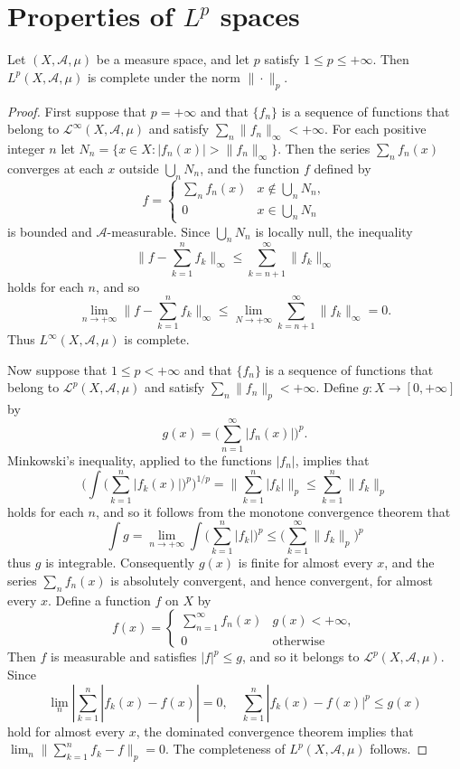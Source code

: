 \section{Properties of \boldmath$L^p$ spaces}
\begin{theorem}\label{L^p is complete}
Let $(X,\mathcal{A},\mu)$ be a measure space, and let $p$ satisfy $1\leq p\leq+\infty$. Then $L^p(X,\mathcal{A},\mu)$ is complete under the norm $\|\cdot\|_p$.
\end{theorem}
\begin{proof}
First suppose that $p=+\infty$ and that $\{f_n\}$ is a sequence of functions that belong to $\mathcal{L}^\infty(X,\mathcal{A},\mu)$ and satisfy $\sum_n\|f_n\|_\infty<+\infty$. For each positive integer $n$ let $N_n=\{x\in X:|f_n(x)|>\|f_n\|_\infty\}$. Then the series $\sum_nf_n(x)$ converges at each $x$ outside $\bigcup_nN_n$, and the function $f$ defined by
\[f=\begin{cases}
\sum_nf_n(x)&x\notin\bigcup_nN_n,\\
0&x\in\bigcup_nN_n
\end{cases}\]
is bounded and $\mathcal{A}$-measurable. Since $\bigcup_nN_n$ is locally null, the inequality
\[\Big\|f-\sum_{k=1}^{n}f_k\Big\|_\infty\leq \sum_{k=n+1}^{\infty}\|f_k\|_\infty\]
holds for each $n$, and so
\[\lim_{n\to+\infty}\Big\|f-\sum_{k=1}^{n}f_k\Big\|_\infty\leq\lim_{N\to+\infty}\sum_{k=n+1}^{\infty}\|f_k\|_\infty=0.\]
Thus $L^\infty(X,\mathcal{A},\mu)$ is complete.\par
Now suppose that $1\leq p<+\infty$ and that $\{f_n\}$ is a sequence of functions that belong to $\mathcal{L}^p(X,\mathcal{A},\mu)$ and satisfy $\sum_n\|f_n\|_p<+\infty$. Define $g:X\to[0,+\infty]$ by
\[g(x)=\Big(\sum_{n=1}^{\infty}|f_n(x)|\Big)^p.\]
Minkowski's inequality, applied to the functions $|f_n|$, implies that
\[\Big(\int\Big(\sum_{k=1}^{n}|f_k(x)|\Big)^p\Big)^{1/p}=\Big\|\sum_{k=1}^{n}|f_k|\Big\|_p\leq\sum_{k=1}^{n}\|f_k\|_p\]
holds for each $n$, and so it follows from the monotone convergence theorem that
\[\int g=\lim_{n\to+\infty}\int\Big(\sum_{k=1}^{n}|f_k|\Big)^p\leq\Big(\sum_{k=1}^{\infty}\|f_k\|_p\Big)^p\]
thus $g$ is integrable. Consequently $g(x)$ is finite for almost every $x$, and the series $\sum_nf_n(x)$ is absolutely convergent, and hence convergent, for almost every $x$. Define a function $f$ on $X$ by
\[f(x)=\begin{cases}
\sum_{n=1}^{\infty}f_n(x)&g(x)<+\infty,\\
0&\text{otherwise}
\end{cases}\]
Then $f$ is measurable and satisfies $|f|^p\leq g$, and so it belongs to $\mathcal{L}^p(X,\mathcal{A},\mu)$. Since
\[\lim_n|\sum_{k=1}^{n}|f_k(x)-f(x)|=0,\quad \sum_{k=1}^{n}|f_k(x)-f(x)|^p\leq g(x)\]
hold for almost every $x$, the dominated convergence theorem implies that $\lim_n\|\sum_{k=1}^{n}f_k-f\|_p=0$. The completeness of $L^p(X,\mathcal{A},\mu)$ follows.
\end{proof}
